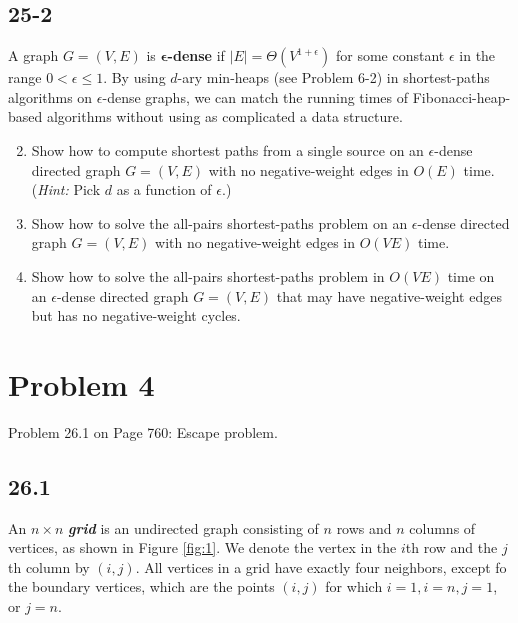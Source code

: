 \documentclass{../../class}
\begin{document}
\subsection*{25-2}
A graph $G = (V, E)$ is $\mathbf{\epsilon}$\textbf{-dense} if $|E| = \Theta(V^{1+\epsilon})$ for some constant $\epsilon$ in the range $0 < \epsilon \leq 1$. By using $d$-ary min-heaps (see Problem 6-2) in shortest-paths algorithms on $\epsilon$-dense graphs, we can match the running times of Fibonacci-heap-based algorithms without using as complicated a data structure.
\begin{enumerate}
    \setcounter{enumi}{1}
    \item Show how to compute shortest paths from a single source on an $\epsilon$-dense directed graph $G = (V, E)$ with no negative-weight edges in $O(E)$ time. (\textit{Hint:} Pick $d$ as a function of $\epsilon$.)
    \item Show how to solve the all-pairs shortest-paths problem on an $\epsilon$-dense directed graph $G = (V, E)$ with no negative-weight edges in $O(VE)$ time.
    \item Show how to solve the all-pairs shortest-paths problem in $O(VE)$ time on an $\epsilon$-dense directed graph $G = (V, E)$ that may have negative-weight edges but has no negative-weight cycles.
\end{enumerate}

\newpage
\section*{Problem 4}
\begin{tcolorbox}
    Problem 26.1 on Page 760: Escape problem.
\end{tcolorbox}

\subsection*{26.1}
An $n\times n$ \textbf{\textit{grid}} is an undirected graph consisting of $n$ rows and $n$ columns of vertices, as shown in Figure \ref{fig:1}. We denote the vertex in the $i$th row and the $j$ th column by $(i, j)$. All vertices in a grid have exactly four neighbors, except fo the boundary vertices, which are the points $(i, j)$ for which $i = 1, i = n, j = 1$, or $j = n$.
\end{document}
